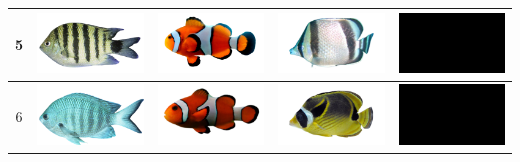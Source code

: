 \begin{longtable}{|c|c|c|c|c|}
    5 & \includegraphics[width=3cm]{gambar/abudefduf/A5} & \includegraphics[width=3cm]{gambar/amphiprion/A5} & \includegraphics[width=3cm]{gambar/chaetodon/C5} & \includegraphics[width=3cm]{gambar/negative_examples/N5} \\
    \hline
    6 & \includegraphics[width=3cm]{gambar/abudefduf/A6} & \includegraphics[width=3cm]{gambar/amphiprion/A6} & \includegraphics[width=3cm]{gambar/chaetodon/C6} & \includegraphics[width=3cm]{gambar/negative_examples/N6} \\
    \hline

\end{longtable}
